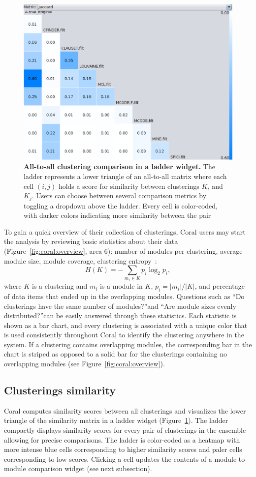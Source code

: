 \documentclass[12pt]{cmuthesis}
\newcommand\Coral{Coral\xspace}
\begin{document}
\begin{figure}[h]
    \centering
    \includegraphics[width=0.60\linewidth]{figures/coral_ladder}
    \caption{\textbf{All-to-all clustering comparison in a ladder widget.} The ladder represents  a lower triangle of an all-to-all matrix where each cell $(i, j)$ holds a score for similarity between clusterings $K_{i}$ and $K_{j}$. Users can choose between several comparison metrics by toggling a dropdown above the ladder. Every cell is color-coded, with darker colors indicating more similarity between the pair} 
    \label{fig:coral:ladder}
  \end{figure}


  To gain a quick overview of their collection of clusterings, \Coral users may start the analysis by reviewing basic statistics about their data (Figure~\ref{fig:coral:overview}, area 6): number of modules per clustering, average module size, module coverage, clustering entropy~\cite{Meila2003}:
  \[
  H(K) = - \sum_{m_i \in K} p_i \log_2 p_i,
  \]
  where $K$ is a clustering and $m_i$ is a module in $K$, $p_i = |m_i| / |K|$, and percentage of data items that ended up in the overlapping modules. Questions such as ``Do clusterings have the same number of modules?''\@ and ``Are module sizes evenly distributed?''\@ can be easily answered through these statistics. Each statistic is shown as a bar chart, and every clustering is associated with a unique color that is used consistently throughout \Coral to identify the clustering anywhere in the system. If a clustering contains overlapping modules, the corresponding bar in the chart is striped as opposed to a solid bar for the clusterings containing no overlapping modules (see Figure~\ref{fig:coral:overview}).

  \subsection{Clusterings similarity}
  \Coral computes similarity scores between all clusterings and visualizes the lower triangle of the similarity matrix in a ladder widget (Figure~\ref{fig:coral:ladder}). The ladder compactly displays similarity scores for every pair of clusterings in the ensemble allowing for precise comparisons. The ladder is color-coded as a heatmap with more intense blue cells corresponding to higher similarity scores and paler cells corresponding to low scores. Clicking a cell updates the contents of a module-to-module comparison widget (see next subsection).
\end{document}
